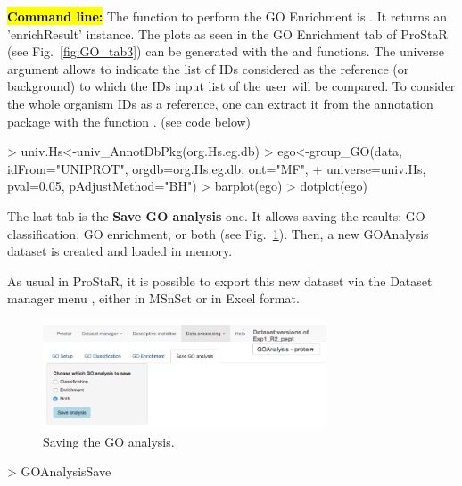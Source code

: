 \documentclass[12pt]{article}
\begin{document}
{\hl{\bf Command line:} The  function to perform the GO 
Enrichment is . It returns an 'enrichResult' instance.
The plots as seen in the GO Enrichment tab of ProStaR 
(see Fig.~\ref{fig:GO_tab3}) can be generated with the  and
 functions. 
The universe argument allows to indicate the list of IDs considered as the 
reference (or background) to which the IDs input list of the user will be 
compared. 
To consider the whole organism IDs as a reference, one can extract it from 
the annotation package with the  function 
. (see code below)


\begin{Schunk}
\begin{Sinput}
> univ.Hs<-univ_AnnotDbPkg(org.Hs.eg.db)
> ego<-group_GO(data, idFrom="UNIPROT", orgdb=org.Hs.eg.db, ont="MF", 
+               universe=univ.Hs, pval=0.05, pAdjustMethod="BH")
> barplot(ego)
> dotplot(ego)
\end{Sinput}
\end{Schunk}


The last tab is the \textbf{Save GO analysis} one. It allows saving the results:
GO classification, GO enrichment, or both (see Fig.~\ref{fig:GO_tab4}).
Then, a new GOAnalysis dataset is created and loaded in memory. 

As usual in ProStaR, it is possible to export this new dataset via the Dataset
manager menu , either in MSnSet or in Excel format. 

\begin {figure}
\centering
\includegraphics[width=0.75\textwidth]{images/GO_tab4.png}
\caption{Saving the GO analysis.}\label{fig:GO_tab4}
\end {figure}

\begin{Schunk}
\begin{Sinput}
> GOAnalysisSave
\end{Sinput}
\end{Schunk}



}
\end{document}
